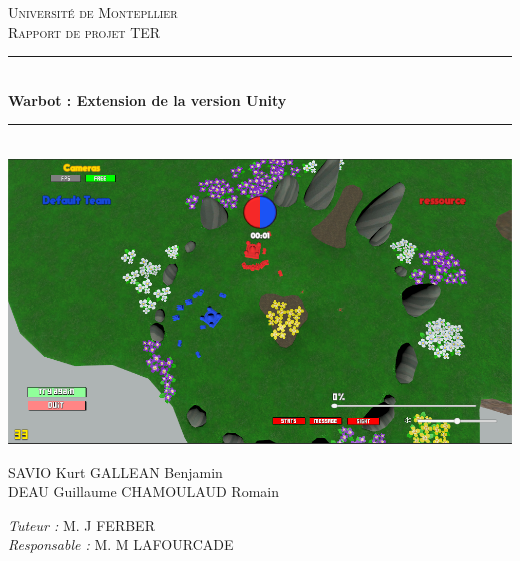 \documentclass{report}
\newcommand{\HRule}{\rule{\linewidth}{0.5mm}}
\begin{document}
\begin{titlepage}
  \begin{sffamily}
  \begin{center}


    \textsc{\LARGE Université de Montepllier}\\[2cm]

    \textsc{Rapport de projet TER}\\[1.5cm]

    \HRule \\[0.4cm]
    { \huge \bfseries Warbot : Extension de la version Unity\\[0.4cm] }

\HRule \\[2cm]
    \includegraphics[scale=0.5]{DATA/warbotactuel.png}
    \\[2cm]

    \vfill
    \begin{minipage}{0.4\textwidth}
      \begin{flushleft} \large
        SAVIO Kurt \newline GALLEAN Benjamin\\

         DEAU Guillaume CHAMOULAUD Romain\\
      \end{flushleft}
    \end{minipage}
    \begin{minipage}{0.4\textwidth}
      \begin{flushright} \large
        \emph{Tuteur :} M. J \textsc{FERBER}\\
        \emph{Responsable : } M. M \textsc{LAFOURCADE}
      \end{flushright}
    \end{minipage}

  \end{center}
  \end{sffamily}
\end{titlepage}
\end{document}
